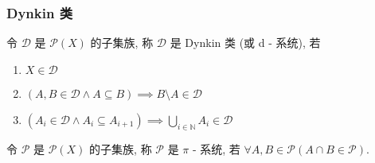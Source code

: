\subsubsection{Dynkin 类}

\begin{definition}[Dynkin 类]
    \label {definition:Dynkin class}
    令 \(\mathcal{D}\) 是 \(\mathcal{P} (X)\) 的子集族, 称 \(\mathcal{D}\) 是 Dynkin 类 (或 d - 系统), 若

    \begin{enumerate}
        \item \(X \in \mathcal{D}\)
        \item \((A,B \in \mathcal{D} \land A \subseteq B) \implies B \setminus A \in \mathcal{D}\)
        \item \((A_i \in \mathcal{D} \land A_i \subseteq A_{i+1}) \implies \bigcup_{i \in \mathbb{N}} A_i \in \mathcal{D}\)
    \end{enumerate}
\end{definition}

\begin{definition}[\(\pi\) - system]
    \label {definition:pi system}
    令 \(\mathcal{P}\) 是 \(\mathcal{P} (X)\) 的子集族, 称 \(\mathcal{P}\) 是 \(\pi\) - 系统, 
    若 \(\forall A,B \in \mathcal{P} (A \cap B \in \mathcal{P})\).
\end{definition}

